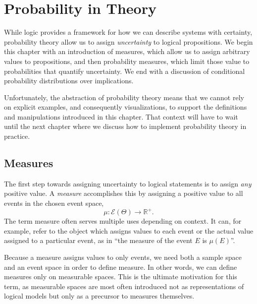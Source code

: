 \chapter{Probability in Theory}

While logic provides a framework for how we can describe systems 
with certainty, probability theory allow us to assign \emph{uncertainty} 
to logical propositions.  We begin this chapter with an introduction of
measures, which allow us to assign arbitrary values to propositions, 
and then probability measures, which limit those value to probabilities
that quantify uncertainty.  We end with a discussion of conditional 
probability distributions over implications.

Unfortunately, the abstraction of probability theory means that we 
cannot rely on explicit examples, and consequently visualizations, 
to support the definitions and manipulations introduced in this chapter.  
That context will have to wait until the next chapter where we discuss 
how to implement probability theory in practice.

\section{Measures}

The first step towards assigning uncertainty to logical statements is to
assign \emph{any} positive value.  A \emph{measure} accomplishes this
by assigning a positive value to all events in the chosen event space,
%
\begin{equation*}
\mu : \mathcal{E} \! \left( \Theta \right) \rightarrow \mathbb{R}^{+}.
\end{equation*}
%
The term measure often serves multiple uses depending on context.
It can, for example, refer to the object which assigns values to each
event or the actual value assigned to a particular event, as in ``the 
measure of the event $E$ is $\mu \! \left( E \right)$''.

Because a measure assigns values to only events, we need both a
sample space and an event space in order to define measure.  In
other words, we can define measures only on measurable spaces.  
This is the ultimate motivation for this term, as measurable spaces 
are most often introduced not as representations of logical models
but only as a precursor to measures themselves.

